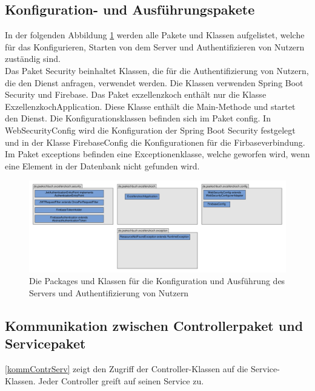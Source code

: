 \subsection{Konfiguration- und Ausführungspakete}
In der folgenden Abbildung \ref{serverconfig} werden alle Pakete und Klassen aufgelistet, welche für das Konfigurieren, Starten von dem Server und Authentifizieren von Nutzern zuständig sind.\\
Das Paket Security beinhaltet Klassen, die für die Authentifizierung von Nutzern, die den Dienst anfragen, verwendet werden. Die Klassen verwenden Spring Boot Security und Firebase. Das Paket exzellenzkoch enthält nur die Klasse ExzellenzkochApplication. Diese Klasse enthält die Main-Methode und startet den Dienst. Die Konfigurationsklassen befinden sich im Paket config. In WebSecurityConfig wird die Konfiguration der Spring Boot Security festgelegt und in der Klasse FirebaseConfig die Konfigurationen für die Firbaseverbindung. Im Paket exceptions befinden eine Exceptionenklasse, welche geworfen wird, wenn eine Element in der Datenbank nicht gefunden wird.

\begin{figure}[H]
	\centering
	\includegraphics[width=\textwidth]{pics/PacketServerConfig.pdf}%
	\caption{Die Packages und Klassen für die Konfiguration und Ausführung des Servers und Authentifizierung von Nutzern}%
	\label{serverconfig}
\end{figure}

\subsection{Kommunikation zwischen Controllerpaket und Servicepaket}

\ref{kommContrServ} zeigt den Zugriff der Controller-Klassen auf die Service-Klassen. Jeder Controller greift auf seinen Service zu.

